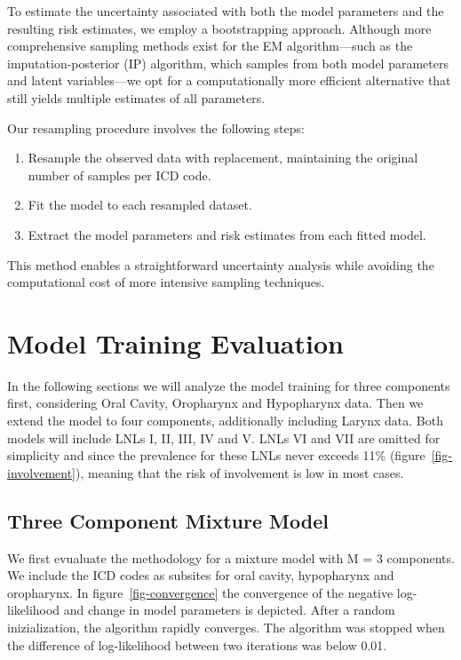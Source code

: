 \documentclass[
  sn-mathphys-num,
]{sn-jnl}
\begin{document}
To estimate the uncertainty associated with both the model parameters
and the resulting risk estimates, we employ a bootstrapping approach.
Although more comprehensive sampling methods exist for the EM
algorithm---such as the imputation-posterior (IP) algorithm, which
samples from both model parameters and latent variables---we opt for a
computationally more efficient alternative that still yields multiple
estimates of all parameters.

Our resampling procedure involves the following steps:

\begin{enumerate}
\def\labelenumi{\arabic{enumi}.}
\item
  Resample the observed data with replacement, maintaining the original
  number of samples per ICD code.
\item
  Fit the model to each resampled dataset.
\item
  Extract the model parameters and risk estimates from each fitted
  model.
\end{enumerate}

This method enables a straightforward uncertainty analysis while
avoiding the computational cost of more intensive sampling techniques.

\section{Model Training Evaluation}\label{sec-model_train}

In the following sections we will analyze the model training for three
components first, considering Oral Cavity, Oropharynx and Hypopharynx
data. Then we extend the model to four components, additionally
including Larynx data. Both models will include LNLs I, II, III, IV and
V. LNLs VI and VII are omitted for simplicity and since the prevalence
for these LNLs never exceeds 11\% (figure~\ref{fig-involvement}),
meaning that the risk of involvement is low in most cases.

\subsection{Three Component Mixture Model}\label{sec-3comp}

We first evualuate the methodology for a mixture model with M = 3
components. We include the ICD codes as subsites for oral cavity,
hypopharynx and oropharynx. In figure~\ref{fig-convergence} the
convergence of the negative log-likelihood and change in model
parameters is depicted. After a random inizialization, the algorithm
rapidly converges. The algorithm was stopped when the difference of
log-likelihood between two iterations was below 0.01.
\end{document}
